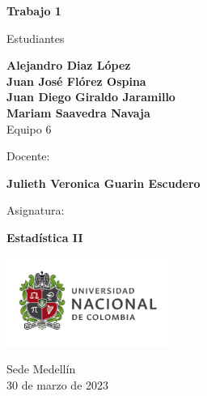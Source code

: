 \begin{titlepage}
   \Large{
   \begin{center}
       \vspace*{1cm}

       \textbf{Trabajo 1}

            
       \vspace{1.5cm}
       
       Estudiantes
       
       \vspace{0.5cm}
        
	\textbf{Alejandro Diaz López}\\    

  \textbf{Juan José Flórez Ospina}\\

	\textbf{Juan Diego Giraldo Jaramillo}\\

	\textbf{Mariam Saavedra Navaja}\\

              \vspace{1cm}
      Equipo 6 \
       
       Docente:
       
       \vspace{0.5cm}

       \textbf{Julieth Veronica Guarin Escudero}
       
       \vspace{0.4cm}

       \vspace{1.4cm}
       
       Asignatura:
       
       \vspace{0.5cm}

       \textbf{Estadística II}

       \vfill

            
       \vspace{0.4cm}
     
       \includegraphics[width=0.4\textwidth]{logounal.png}
            
       Sede Medellín\\
       30 de marzo de 2023
       
   \end{center}
   }
\end{titlepage}